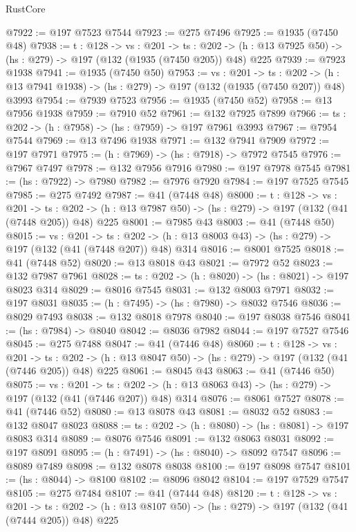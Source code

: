 \begin{lexlean}{RustCore}
\begin{coremodule}
@7922 := @197 @7523 @7544
@7923 := @275 @7496
@7925 := @1935 (@7450 @48)
@7938 := {t : @128} ->
  {vs : @201} ->
  {ts : @202} -> (h : @13 @7925 @50) -> (hs : @279) -> @197 (@132 (@1935 (@7450 @205)) @48) @225
@7939 := @7923 @1938
@7941 := @1935 (@7450 @50)
@7953 := {vs : @201} ->
  {ts : @202} -> (h : @13 @7941 @1938) -> (hs : @279) -> @197 (@132 (@1935 (@7450 @207)) @48) @3993
@7954 := @7939 @7523
@7956 := @1935 (@7450 @52)
@7958 := @13 @7956 @1938
@7959 := @7910 @52
@7961 := @132 @7925 @7899
@7966 := {ts : @202} -> (h : @7958) -> (hs : @7959) -> @197 @7961 @3993
@7967 := @7954 @7544
@7969 := @13 @7496 @1938
@7971 := @132 @7941 @7909
@7972 := @197 @7971
@7975 := (h : @7969) -> (hs : @7918) -> @7972 @7545
@7976 := @7967 @7497
@7978 := @132 @7956 @7916
@7980 := @197 @7978 @7545
@7981 := (hs : @7922) -> @7980
@7982 := @7976 @7920
@7984 := @197 @7525 @7545
@7985 := @275 @7492
@7987 := @41 (@7448 @48)
@8000 := {t : @128} ->
  {vs : @201} ->
  {ts : @202} -> (h : @13 @7987 @50) -> (hs : @279) -> @197 (@132 (@41 (@7448 @205)) @48) @225
@8001 := @7985 @43
@8003 := @41 (@7448 @50)
@8015 := {vs : @201} ->
  {ts : @202} -> (h : @13 @8003 @43) -> (hs : @279) -> @197 (@132 (@41 (@7448 @207)) @48) @314
@8016 := @8001 @7525
@8018 := @41 (@7448 @52)
@8020 := @13 @8018 @43
@8021 := @7972 @52
@8023 := @132 @7987 @7961
@8028 := {ts : @202} -> (h : @8020) -> (hs : @8021) -> @197 @8023 @314
@8029 := @8016 @7545
@8031 := @132 @8003 @7971
@8032 := @197 @8031
@8035 := (h : @7495) -> (hs : @7980) -> @8032 @7546
@8036 := @8029 @7493
@8038 := @132 @8018 @7978
@8040 := @197 @8038 @7546
@8041 := (hs : @7984) -> @8040
@8042 := @8036 @7982
@8044 := @197 @7527 @7546
@8045 := @275 @7488
@8047 := @41 (@7446 @48)
@8060 := {t : @128} ->
  {vs : @201} ->
  {ts : @202} -> (h : @13 @8047 @50) -> (hs : @279) -> @197 (@132 (@41 (@7446 @205)) @48) @225
@8061 := @8045 @43
@8063 := @41 (@7446 @50)
@8075 := {vs : @201} ->
  {ts : @202} -> (h : @13 @8063 @43) -> (hs : @279) -> @197 (@132 (@41 (@7446 @207)) @48) @314
@8076 := @8061 @7527
@8078 := @41 (@7446 @52)
@8080 := @13 @8078 @43
@8081 := @8032 @52
@8083 := @132 @8047 @8023
@8088 := {ts : @202} -> (h : @8080) -> (hs : @8081) -> @197 @8083 @314
@8089 := @8076 @7546
@8091 := @132 @8063 @8031
@8092 := @197 @8091
@8095 := (h : @7491) -> (hs : @8040) -> @8092 @7547
@8096 := @8089 @7489
@8098 := @132 @8078 @8038
@8100 := @197 @8098 @7547
@8101 := (hs : @8044) -> @8100
@8102 := @8096 @8042
@8104 := @197 @7529 @7547
@8105 := @275 @7484
@8107 := @41 (@7444 @48)
@8120 := {t : @128} ->
  {vs : @201} ->
  {ts : @202} -> (h : @13 @8107 @50) -> (hs : @279) -> @197 (@132 (@41 (@7444 @205)) @48) @225

\end{coremodule}
\end{lexlean}
